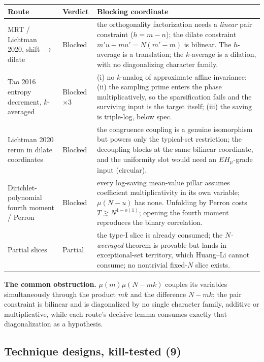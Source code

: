 \documentclass[11pt,a4paper]{article}
\theoremstyle{plain}
\theoremstyle{definition}
\begin{document}
\begin{longtable}{p{}p{}p{}}
\hline
Route & Verdict & Blocking coordinate\\
\hline
\endhead
MRT / Lichtman 2020, shift $\to$ dilate & Blocked &
 the orthogonality factorization needs a \emph{linear} pair
 constraint ($h = m-n$); the dilate constraint
 $m'u - mu' = N(m'-m)$ is bilinear. The $h$-average is a translation;
 the $k$-average is a dilation, with no diagonalizing character
 family.\\
Tao 2016 entropy decrement, $k$-averaged & Blocked $\times 3$ &
 (i) no $k$-analog of approximate affine invariance; (ii) the sampling
 prime enters the phase multiplicatively, so the sparsification fails
 and the surviving input is the target itself; (iii) the saving is
 triple-log, below spec.\\
Lichtman 2020 rerun in dilate coordinates & Blocked &
 the congruence coupling is a genuine isomorphism but powers only the
 typical-set restriction; the decoupling blocks at the same bilinear
 coordinate, and the uniformity slot would need an $EH_\mu$-grade
 input (circular).\\
Dirichlet-polynomial fourth moment / Perron & Blocked &
 every log-saving mean-value pillar assumes coefficient
 multiplicativity in its own variable; $\mu(N-u)$ has none. Unfolding
 by Perron costs $T \gtrsim N^{1-o(1)}$; opening the fourth moment
 reproduces the binary correlation.\\
Partial slices & Partial &
 the type-I slice is already consumed; the \emph{$N$-averaged}
 theorem is provable but lands in exceptional-set territory, which
 Huang--Li cannot consume; no nontrivial fixed-$N$ slice exists.\\
\hline
\end{longtable}

\noindent
\textbf{The common obstruction.} $\mu(m)\mu(N-mk)$ couples its
variables simultaneously through the product $mk$ and the difference
$N-mk$; the pair constraint is bilinear and is diagonalized by no
single character family, additive or multiplicative, while each
route's decisive lemma consumes exactly that diagonalization as a
hypothesis.

\subsection{Technique designs, kill-tested (9)}
\end{document}
